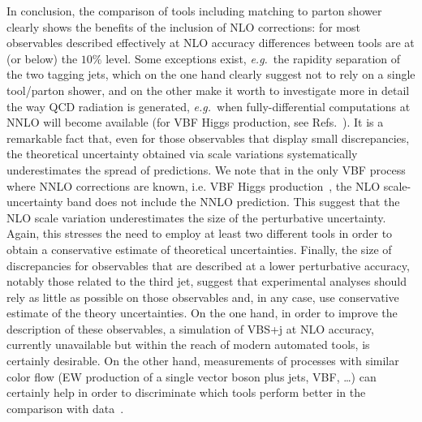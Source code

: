 \documentclass[twocolumn,epjc3]{svjour3} %
\begin{document}
In conclusion, the comparison of tools including matching to parton shower clearly shows the benefits of the inclusion of NLO corrections: for most observables described
effectively at NLO accuracy differences between tools are at (or below) the $10\%$ level.
Some exceptions exist, \emph{e.g.}\ the rapidity separation of the two tagging jets, which
on the one hand clearly suggest not to rely on a single tool/parton shower, and on the other make it worth to investigate more in detail the way QCD radiation is
generated, \emph{e.g.}\ when fully-differential computations at NNLO will become available (for VBF Higgs production, see Refs.~\cite{Cacciari:2015jma, Cruz-Martinez:2018rod}). It is a remarkable fact that, even for those observables that display small discrepancies,
the theoretical uncertainty obtained via scale variations systematically underestimates the spread of predictions. We note 
that in the only VBF process where NNLO corrections are known, i.e. VBF Higgs production~\cite{Cacciari:2015jma, Cruz-Martinez:2018rod}, 
the NLO scale-uncertainty band does not include the NNLO prediction. This suggest that the NLO scale variation 
underestimates the size of the perturbative uncertainty. Again, this stresses the need
 to employ at least two different tools in order to obtain a conservative estimate of theoretical uncertainties. Finally, the size of discrepancies for observables that are described at a lower perturbative accuracy, notably those related to the third jet, suggest that
experimental analyses should rely as little as possible on those observables and, in any case, use conservative estimate of the theory
uncertainties. On the one hand, in order to improve the
description of these observables, a simulation of VBS+j at NLO accuracy, currently unavailable but within the reach of modern
automated tools, is certainly desirable.
On the other hand, measurements of processes with similar
color flow (EW production of a single vector boson plus jets,
VBF, \ldots) can certainly help in order to discriminate which tools perform better in the comparison with data~\cite{Aaboud:2017emo,Sirunyan:2017jej}.
\end{document}
